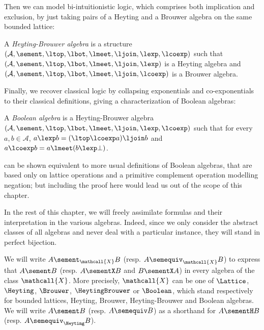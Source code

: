 Then we can model bi-intuitionistic logic, which comprises both implication and
exclusion, by just taking pairs of a Heyting and a Brouwer algebra on the same
bounded lattice:

\begin{definition}
  A \emph{Heyting-Brouwer algebra} is a structure $(\mathcal{A}, \sement, \ltop,
  \lbot, \lmeet, \ljoin, \lexp, \lcoexp)$ such that $(\mathcal{A}, \sement,
  \ltop, \lbot, \lmeet, \ljoin, \lexp)$ is a Heyting algebra and $(\mathcal{A},
  \sement, \ltop, \lbot, \lmeet, \ljoin, \lcoexp)$ is a Brouwer algebra.
\end{definition}

Finally, we recover classical logic by collapsing exponentials and
co-exponentials to their classical definitions, giving a characterization of
Boolean algebras:

\begin{definition}
  A \emph{Boolean algebra} is a Heyting-Brouwer algebra $(\mathcal{A}, \sement,
  \ltop, \lbot, \lmeet, \ljoin, \lexp, \lcoexp)$ such that for every $a, b \in
  \mathcal{A}$, $a \lexp b = (\ltop \lcoexp a) \ljoin b$ and $a \lcoexp b = a
  \lmeet (b \lexp \bot)$.
\end{definition}

\begin{remark}
 can be shown equivalent to more
usual definitions of Boolean algebras, that are based only on lattice operations
and a primitive complement operation modelling negation; but including the proof
here would lead us out of the scope of this chapter.
\end{remark}

In the rest of this chapter, we will freely assimilate formulas and their
interpretation in the various algebras. Indeed, since we only consider the
abstract classes of all algebras and never deal with a particular instance,
they will stand in perfect bijection.

\begin{definition}
  We will write $A \sement_{\mathcall{X}} B$ (resp. $A \semequiv_{\mathcall{X}}
  B$) to express that $A \sement B$ (resp. $A \sementX B$ and $B \sementX A$) in
  every algebra of the class $\mathcall{X}$. More precisely, $\mathcall{X}$ can
  be one of $\Lattice$, $\Heyting$, $\Brouwer$, $\HeytingBrouwer$ or $\Boolean$,
  which stand respectively for bounded lattices, Heyting, Brouwer,
  Heyting-Brouwer and Boolean algebras. We will write $A \sement B$ (resp. $A
  \semequiv B$) as a shorthand for $A \sementH B$ (resp. $A \semequiv_{\Heyting}
  B$).
\end{definition}

